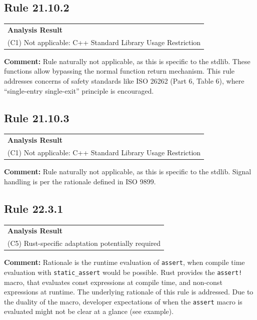 \subsection*{Rule 21.10.2}
\begin{longtable}{p{13cm}}
\textbf{Analysis Result} \\
(C1) Not applicable: C++ Standard Library Usage Restriction \\
\end{longtable}
\textbf{Comment:} Rule naturally not applicable, as this is specific to the \Cpp stdlib. These functions allow bypassing the normal function return mechanism. This rule addresses concerns of safety standards like ISO 26262 (Part 6, Table 6), where ``single-entry single-exit'' principle is encouraged. \\
\subsection*{Rule 21.10.3}
\begin{longtable}{p{13cm}}
\textbf{Analysis Result} \\
(C1) Not applicable: C++ Standard Library Usage Restriction \\
\end{longtable}
\textbf{Comment:} Rule naturally not applicable, as this is specific to the \Cpp stdlib. Signal handling is per the rationale defined in ISO 9899. \\
\subsection*{Rule 22.3.1}
\begin{longtable}{p{13cm}}
\textbf{Analysis Result} \\
(C5) Rust-specific adaptation potentially required \\
\end{longtable}
\textbf{Comment:} Rationale is the runtime evaluation of \texttt{assert}, when compile time evaluation with \texttt{static\_assert} would be possible. Rust provides the \texttt{assert!} macro, that evaluates const expressions at compile time, and non-const expressions at runtime. The underlying rationale of this rule is addressed. Due to the duality of the macro, developer expectations of when the \texttt{assert} macro is evaluated might not be clear at a glance (see example). \\


